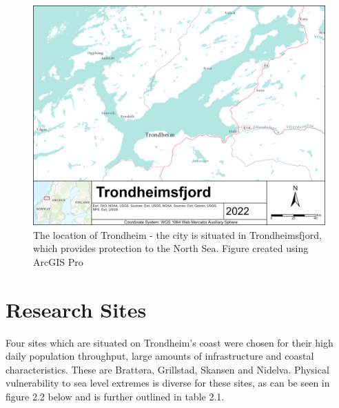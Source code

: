 \begin{figure}[h!]
    \centering
    \includegraphics[width=1.0\textwidth]{fig/Trondheimsfjord.png}
    \caption{The location of Trondheim - the city is situated in Trondheimsfjord, which provides protection to the North Sea. Figure created using ArcGIS Pro}
    \label{fig:research area Trondheim}
\end{figure}



\section{Research Sites}
Four sites which are situated on Trondheim's coast were chosen for their high daily population throughput, large amounts of infrastructure and coastal characteristics. These are Brattøra, Grillstad, Skansen and Nidelva. Physical vulnerability to sea level extremes is diverse for these sites, as can be seen in figure 2.2 below and is further outlined in table 2.1. 
\paragraph{}

